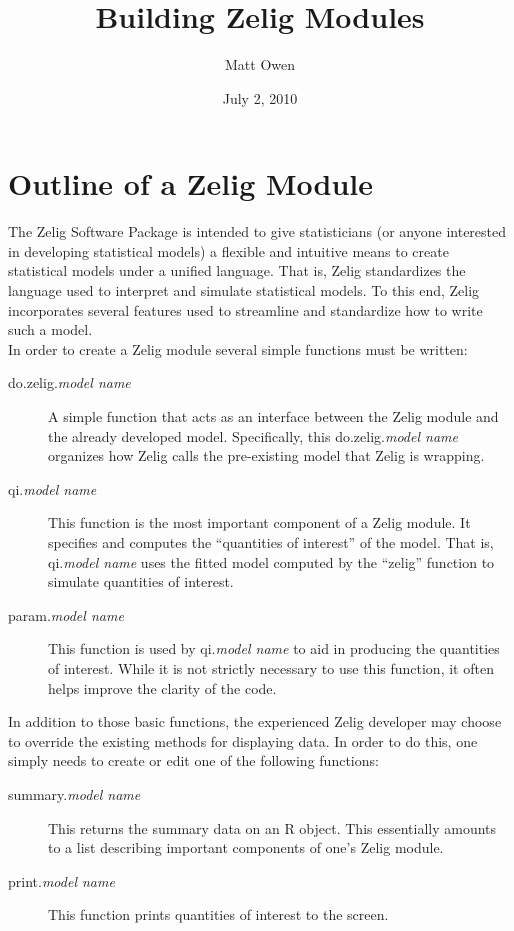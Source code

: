 \documentclass[a4paper, 11pt]{article}
\begin{document}
\title{Building Zelig Modules}
\author{Matt Owen}
\date{July 2, 2010}
\maketitle

\section{Outline of a Zelig Module}

The Zelig Software Package is intended to give statisticians (or anyone interested in developing statistical models) a flexible and intuitive means to create statistical models under a unified language.  That is, Zelig standardizes the language used to interpret and simulate statistical models.  To this end, Zelig incorporates several features used to streamline and standardize how to write such a model.\\

In order to create a Zelig module several simple functions must be written:

\begin{description}
	\item[do.zelig.\emph{model name}]{A simple function that acts as an interface between the Zelig module and the already developed model.  Specifically, this do.zelig.\emph{model name} organizes how Zelig calls the pre-existing model that Zelig is wrapping.}
	\item[qi.\emph{model name}]{This function is the most important component of a Zelig module.  It specifies and computes the ``quantities of interest'' of the model.  That is, qi.\emph{model name} uses the fitted model computed by the ``zelig'' function to simulate quantities of interest.}
	\item[param.\emph{model name}]{This function is used by qi.\emph{model name} to aid in producing the quantities of interest.  While it is not strictly necessary to use this function, it often helps improve the clarity of the code.}
\end{description}

In addition to those basic functions, the experienced Zelig developer may choose to override the existing methods for displaying data.  In order to do this, one simply needs to create or edit one of the following functions:

\begin{description}
	\item[summary.\emph{model name}]{This returns the summary data on an R object.  This essentially amounts to a list describing important components of one's Zelig module.}
	\item[print.\emph{model name}]{This function prints quantities of interest to the screen.}
\end{description}
\end{document}
